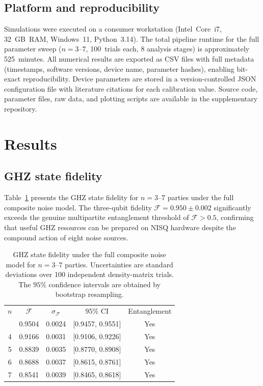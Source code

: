 \documentclass[aip, amsmath, amssymb, preprint, longbibliography]{revtex4-2}
\newcommand{\fid}{\mathcal{F}}
\begin{document}
\subsection{Platform and reproducibility}\label{sec:platform}

Simulations were executed on a consumer workstation (Intel~Core~i7,
32~GB~RAM, Windows~11, Python~3.14). The total pipeline runtime for
the full parameter sweep ($n=3$--$7$, 100~trials each, 8
analysis stages) is approximately 525~minutes. All numerical results
are exported as CSV files with full metadata (timestamps, software
versions, device name, parameter hashes), enabling bit-exact
reproducibility. Device parameters are stored in a version-controlled
JSON configuration file with literature citations for each calibration
value. Source code, parameter files, raw data, and plotting scripts are
available in the supplementary repository.

\section{Results}\label{sec:results}

\subsection{GHZ state fidelity}\label{sec:fidelity_results}

Table~\ref{tab:fidelity} presents the GHZ state fidelity for
$n=3$--$7$ parties under the full composite noise model. The three-qubit
fidelity $\fid=0.950\pm0.002$ significantly exceeds the genuine
multipartite entanglement threshold of $\fid>0.5$, confirming that
useful GHZ resources can be prepared on NISQ hardware despite the
compound action of eight noise sources.

\begin{table}[H]
\caption{\label{tab:fidelity}GHZ state fidelity under the full composite
noise model for $n=3$--$7$ parties. Uncertainties are standard deviations
over 100 independent density-matrix trials. The $95\%$ confidence
intervals are obtained by bootstrap resampling.}
\begin{ruledtabular}
\begin{tabular}{ccccc}
$n$ & $\fid$ & $\sigma_{\fid}$ & $95\%$ CI & Entanglement \\
\colrule
3 & 0.9504 & 0.0024 & [0.9457, 0.9551] & Yes \\
4 & 0.9166 & 0.0031 & [0.9106, 0.9226] & Yes \\
5 & 0.8839 & 0.0035 & [0.8770, 0.8908] & Yes \\
6 & 0.8688 & 0.0037 & [0.8615, 0.8761] & Yes \\
7 & 0.8541 & 0.0039 & [0.8465, 0.8618] & Yes \\
\end{tabular}
\end{ruledtabular}
\end{table}
\end{document}
